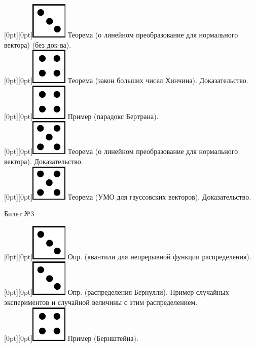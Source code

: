 \documentclass[10pt]{article}
\begin{document}
\raisebox{-1pt}[0pt][0pt]{\includegraphics[width=0.02\linewidth]{3.png}} Теорема (о линейном преобразование для нормального вектора) (без док-ва). \\

\raisebox{-1pt}[0pt][0pt]{\includegraphics[width=0.02\linewidth]{4.png}}  Теорема (закон больших чисел Хинчина).  Доказательство. \\

\raisebox{-1pt}[0pt][0pt]{\includegraphics[width=0.02\linewidth]{4.png}} Пример (парадокс Бертрана). \\ 

\raisebox{-1pt}[0pt][0pt]{\includegraphics[width=0.02\linewidth]{5.png}} Теорема (о линейном преобразование для нормального вектора). Доказательство. \\

\raisebox{-1pt}[0pt][0pt]{\includegraphics[width=0.02\linewidth]{5.png}} Теорема (УМО для гауссовских векторов). Доказательство. \\

\begin{center} {\Large Билет №3} \end{center} 

\raisebox{-1pt}[0pt][0pt]{\includegraphics[width=0.02\linewidth]{3.png}}   Опр. (квантили для непрерывной функции распределения). \\

\raisebox{-1pt}[0pt][0pt]{\includegraphics[width=0.02\linewidth]{3.png}} Опр. (распределения Бернулли).  Пример случайных экспериментов и случайной величины с этим распределением. \\

\raisebox{-1pt}[0pt][0pt]{\includegraphics[width=0.02\linewidth]{4.png}}  Пример (Бернштейна). \\
\end{document}
